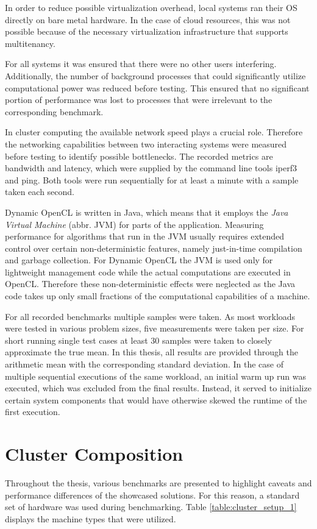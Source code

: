 In order to reduce possible virtualization overhead, local systems ran their OS directly on bare metal hardware. In the case of cloud resources, this was not possible because of the necessary virtualization infrastructure that supports multitenancy.

For all systems it was ensured that there were no other users interfering. Additionally, the number of background processes that could significantly utilize computational power was reduced before testing. This ensured that no significant portion of performance was lost to processes that were irrelevant to the corresponding benchmark.

In cluster computing the available network speed plays a crucial role. Therefore the networking capabilities between two interacting systems were measured before testing to identify possible bottlenecks. The recorded metrics are bandwidth and latency, which were supplied by the command line tools iperf3 and ping. Both tools were run sequentially for at least a minute with a sample taken each second.

Dynamic OpenCL is written in Java, which means that it employs the \textit{Java Virtual Machine} (abbr. JVM) for parts of the application. Measuring performance for algorithms that run in the JVM usually requires extended control over certain non-deterministic features, namely just-in-time compilation and garbage collection\cite{rigorous_java}. For Dynamic OpenCL the JVM is used only for lightweight management code while the actual computations are executed in OpenCL. Therefore these non-deterministic effects were neglected as the Java code takes up only small fractions of the computational capabilities of a machine.

For all recorded benchmarks multiple samples were taken. As most workloads were tested in various problem sizes, five measurements were taken per size. For short running single test cases at least 30 samples were taken to closely approximate the true mean\cite{measuring_computer_performance}. In this thesis, all results are provided through the arithmetic mean with the corresponding standard deviation. In the case of multiple sequential executions of the same workload, an initial warm up run was executed, which was excluded from the final results. Instead, it served to initialize certain system components that would have otherwise skewed the runtime of the first execution.

\section{Cluster Composition}
\label{cluster_composition}
Throughout the thesis, various benchmarks are presented to highlight caveats and performance differences of the showcased solutions. For this reason, a standard set of hardware was used during benchmarking. Table \ref{table:cluster_setup_1} displays the machine types that were utilized.

